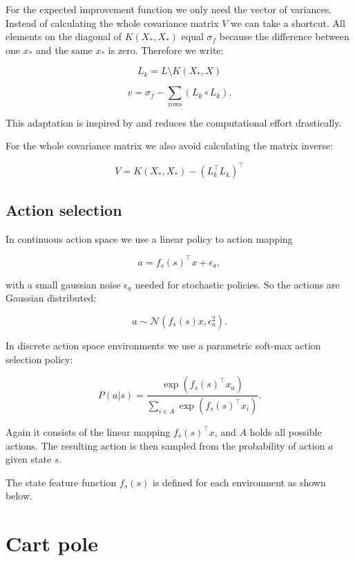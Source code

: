 For the expected improvement function we only need the vector of variances. Instead of calculating the whole covariance matrix $V$ we can take a shortcut. All elements on the diagonal of $K(X_*,X_*)$ equal $\sigma_f$ because the difference between one $x_*$ and the same $x_*$ is zero. Therefore we write:

$$L_k = L \setminus K(X_*,X)$$

$$v = \sigma_f - \sum_{\text{rows}} (L_k \circ L_k).$$

This adaptation is inspired by \cite{nandoCode} and reduces the computational effort drastically.

For the whole covariance matrix we also avoid calculating the matrix inverse:

$$V = K(X_*,X_*) - (L_k^\top L_k)^\top $$




\subsection{Action selection}

In continuous action space we use a linear policy to action mapping

$$a = f_s(s)^\top x + \epsilon_a,$$

with a small gaussian noise $\epsilon_a$ needed for stochastic policies. So the actions are Gaussian distributed:

$$a \sim \mathcal{N}(f_s(s) x,\epsilon_a^2).$$

In discrete action space environments we use a parametric soft-max action selection policy:

$$P(a|s)= \frac{\exp(f_s(s)^\top x_a)}{\sum_{i\in A} \exp(f_s(s)^\top x_i)}.$$

Again it consists of the linear mapping $f_s(s)^\top x$, and $A$ holds all possible actions. The resulting action is then sampled from the probability of action $a$ given state $s$.

The state feature function $f_s(s)$ is defined for each environment as shown below.

\section{Cart pole}


